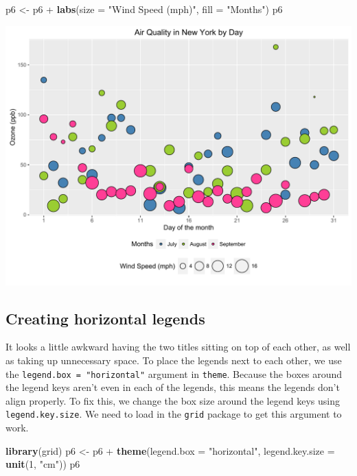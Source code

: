 \documentclass[]{article}
\newenvironment{Shaded}{\begin{snugshade}}{\end{snugshade}}
\newcommand{\KeywordTok}[1]{\textcolor[rgb]{0.13,0.29,0.53}{\textbf{{#1}}}}
\newcommand{\DataTypeTok}[1]{\textcolor[rgb]{0.13,0.29,0.53}{{#1}}}
\newcommand{\DecValTok}[1]{\textcolor[rgb]{0.00,0.00,0.81}{{#1}}}
\newcommand{\StringTok}[1]{\textcolor[rgb]{0.31,0.60,0.02}{{#1}}}
\newcommand{\NormalTok}[1]{{#1}}
\begin{document}
\begin{Shaded}
\begin{Highlighting}[]
\NormalTok{p6 <-}\StringTok{ }\NormalTok{p6 +}\StringTok{ }\KeywordTok{labs}\NormalTok{(}\DataTypeTok{size =} \StringTok{"Wind Speed (mph)"}\NormalTok{, }\DataTypeTok{fill =} \StringTok{"Months"}\NormalTok{)}
\NormalTok{p6}
\end{Highlighting}
\end{Shaded}

\begin{center}\includegraphics{0_all_posts_pdf/wscatter_15-1} \end{center}

\subsection{Creating horizontal
legends}\label{creating-horizontal-legends}

It looks a little awkward having the two titles sitting on top of each
other, as well as taking up unnecessary space. To place the legends next
to each other, we use the \texttt{legend.box\ =\ "horizontal"} argument
in \texttt{theme}. Because the boxes around the legend keys aren't even
in each of the legends, this means the legends don't align properly. To
fix this, we change the box size around the legend keys using
\texttt{legend.key.size}. We need to load in the \texttt{grid} package
to get this argument to work.

\begin{Shaded}
\begin{Highlighting}[]
\KeywordTok{library}\NormalTok{(grid) }
\NormalTok{p6 <-}\StringTok{ }\NormalTok{p6 +}\StringTok{ }\KeywordTok{theme}\NormalTok{(}\DataTypeTok{legend.box =} \StringTok{"horizontal"}\NormalTok{, }\DataTypeTok{legend.key.size =} \KeywordTok{unit}\NormalTok{(}\DecValTok{1}\NormalTok{, }\StringTok{"cm"}\NormalTok{))}
\NormalTok{p6}
\end{Highlighting}
\end{Shaded}
\end{document}
